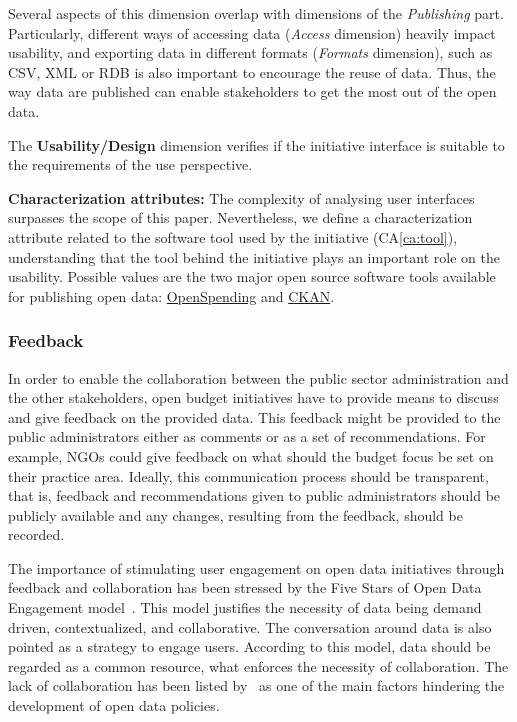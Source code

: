 Several aspects of this dimension overlap with dimensions of the \emph{Publishing} part.
Particularly, different ways of accessing data (\emph{Access} dimension) heavily impact usability, and exporting data in different formats (\emph{Formats} dimension), such as CSV, XML or RDB is also important to encourage the reuse of data.
Thus, the way data are published can enable stakeholders to get the most out of the open data. 
		\begin{defn}The \textbf{Usability/Design} dimension verifies if the initiative interface is suitable to the requirements of the use perspective.
		\end{defn}
		\noindent\textbf{Characterization attributes:}
The complexity of analysing user interfaces surpasses the scope of this paper. 
Nevertheless, we define a characterization attribute related to the software tool used by the initiative (CA\ref{ca:tool}), understanding that the tool behind the initiative plays an important role on the usability. 
Possible values are the two major open source software tools available for publishing open data: \href{http://github.com/openspending/}{OpenSpending} and \href{http://ckan.org}{CKAN}.

\vspace{.1cm}
	\subsubsection{Feedback}
In order to enable the collaboration between the public sector administration and the other stakeholders, open budget initiatives have to provide means to discuss and give feedback on the provided data. %
This feedback might be provided to the public administrators either as comments or as a set of recommendations.
For example, NGOs could give feedback on what should the budget focus be set on their practice area. 
Ideally, this communication process should be transparent, that is, feedback and recommendations given to public administrators should be publicly available and any changes, resulting from the feedback, should be recorded.

The importance of stimulating user engagement on open data initiatives through feedback and collaboration has been stressed by the Five Stars of Open Data Engagement model~\cite{Davies2012}.
This model justifies the necessity of data being demand driven, contextualized, and collaborative. 
The conversation around data is also pointed as a strategy to engage users.
According to this model, data should be regarded as a common resource, what enforces the necessity of collaboration. 
The lack of collaboration has been listed by~\cite{Zuiderwijk2014} as one of the main factors hindering the development of open data policies.

